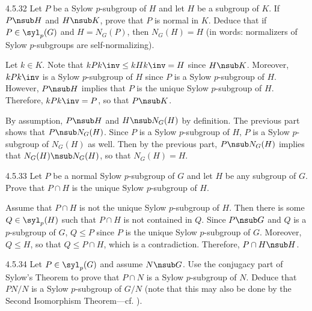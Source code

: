 \begin{exercise}{4.5.32}
	Let $P$ be a Sylow $p$-subgroup of $H$ and let $H$ be a subgroup of $K$.
	If $P \nsub H$ and $H \nsub K$, prove that $P$ is normal in $K$.
	Deduce that if $P \in \syl_p(G)$ and $H = N_G(P)$, then $N_G(H) = H$ (in words: normalizers of Sylow $p$-subgroups are self-normalizing).
\end{exercise}

\begin{sol}
	Let $k \in K$.
	Note that $kPk\inv \leq kHk\inv = H$ since $H \nsub K$.
	Moreover, $kPk\inv$ is a Sylow $p$-subgroup of $H$ since $P$ is a Sylow $p$-subgroup of $H$.
	However, $P \nsub H$ implies that $P$ is the unique Sylow $p$-subgroup of $H$.
	Therefore, $kPk\inv = P$, so that $P \nsub K$.

	By assumption, $P \nsub H$ and $H \nsub N_G(H)$ by definition.
	The previous part shows that $P \nsub N_G(H)$.
	Since $P$ is a Sylow $p$-subgroup of $H$, $P$ is a Sylow $p$-subgroup of $N_G(H)$ as well.
	Then by the previous part, $P \nsub N_G(H)$ implies that $N_G(H) \nsub N_G(H)$, so that $N_G(H) = H$.
\end{sol}

\begin{exercise}{4.5.33}
	Let $P$ be a normal Sylow $p$-subgroup of $G$ and let $H$ be any subgroup of $G$.
	Prove that $P \cap H$ is the unique Sylow $p$-subgroup of $H$.
\end{exercise}

\begin{sol}
	Assume that $P \cap H$ is not the unique Sylow $p$-subgroup of $H$.
	Then there is some $Q \in \syl_p(H)$ such that $P \cap H$ is not contained in $Q$.
	Since $P \nsub G$ and $Q$ is a $p$-subgroup of $G$, $Q \leq P$ since $P$ is the unique Sylow $p$-subgroup of $G$.
	Moreover, $Q \leq H$, so that $Q \leq P \cap H$, which is a contradiction.
	Therefore, $P \cap H \nsub H$.
\end{sol}

\begin{exercise}{4.5.34}
	Let $P \in \syl_p(G)$ and assume $N \nsub G$.
	Use the conjugacy part of Sylow's Theorem to prove that $P \cap N$ is a Sylow $p$-subgroup of $N$.
	Deduce that $PN/N$ is a Sylow $p$-subgroup of $G/N$ (note that this may also be done by the Second Isomorphism Theorem—cf. ).
\end{exercise}

